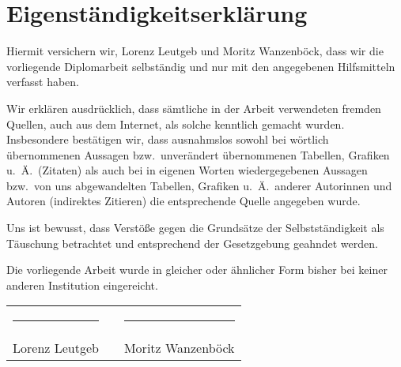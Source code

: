 \vspace*{\fill}
\section*{Eigenständigkeitserklärung}

Hiermit versichern wir, Lorenz Leutgeb und Moritz Wanzenböck, dass wir die vorliegende Diplomarbeit selbständig und nur mit den angegebenen Hilfsmitteln verfasst haben. 

Wir erklären ausdrücklich, dass sämtliche in der Arbeit verwendeten fremden Quellen, auch aus dem Internet, als solche kenntlich gemacht wurden. Insbesondere bestätigen wir, dass ausnahmslos sowohl bei wörtlich übernommenen Aussagen bzw.\ unverändert übernommenen Tabellen, Grafiken u.~Ä.\ (Zitaten) als auch bei in eigenen Worten wiedergegebenen Aussagen bzw.\ von uns abgewandelten Tabellen, Grafiken u.~Ä.\ anderer Autorinnen und Autoren (indirektes Zitieren) die entsprechende Quelle angegeben wurde.

Uns ist bewusst, dass Verstöße gegen die Grundsätze der Selbstständigkeit als Täuschung betrachtet und entsprechend der Gesetzgebung geahndet werden.

Die vorliegende Arbeit wurde in gleicher oder ähnlicher Form bisher bei keiner anderen Institution eingereicht.

\vspace{3cm}

\begin{center}
\begin{tabular}{ccc}
    \rule{0.4\textwidth}{0.5pt} & \hspace{5mm} & \rule{0.4\textwidth}{0.5pt} \\
    Lorenz Leutgeb & & Moritz Wanzenböck
\end{tabular}
\end{center}
\vspace*{\fill}
